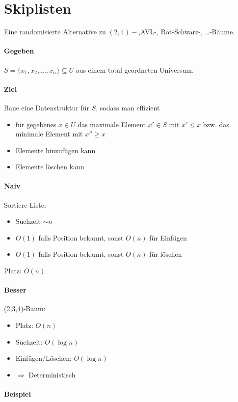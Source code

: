 \section{Skiplisten}
Eine randomisierte Alternative zu $(2,4)-$,AVL-, Rot-Schwarz-, \dots -Bäume.

\paragraph*{Gegeben} $S = \{ x_1, x_2, \dots, x_n\} \subseteq U$ aus einem total geordneten Universum.

\paragraph*{Ziel} Baue eine Datenstruktur für $S$, sodass man effizient
\begin{itemize}
	\item für gegebenes $x \in U$ das maximale Element $x' \in S$ mit $x' \leq x$ bzw. das minimale Element mit $x'' \geq x$
	\item Elemente hinzufügen kann
	\item Elemente löschen kann
\end{itemize}

\paragraph*{Naiv} Sortiere Liste:
\begin{itemize}
	\item Suchzeit $\sim n$
	\item $O(1)$ falls Position bekannt, sonst $O(n)$ für Einfügen
	\item $O(1)$ falls Position bekannt, sonst $O(n)$ für löschen
\end{itemize}
Platz: $O(n)$

\paragraph*{Besser} (2,3,4)-Baum:
\begin{itemize}
	\item Platz: $O(n)$
	\item Suchzeit: $O(\log n)$
	\item Einfügen/Löschen: $O(\log n)$
	\item $\Rightarrow$ Deterministisch
\end{itemize}

\paragraph*{Beispiel} %

